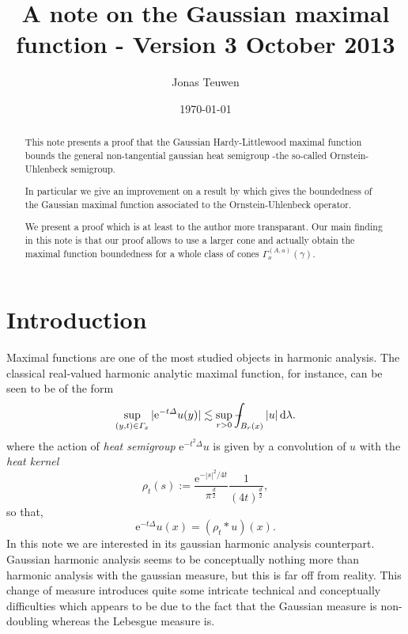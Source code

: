 \documentclass[a4paper,oneside,10pt]{amsproc}
\title[Gaussian maximal functions]{A note on the Gaussian maximal
  function - Version 3 October 2013}
\author{Jonas Teuwen}%
\date{\today}
\theoremstyle{plain}
\theoremstyle{remark}
\newcommand{\D}{\,\textup{d}}
\def\Xint#1{\mathchoice
  {\XXint\displaystyle\textstyle{#1}}%
  {\XXint\textstyle\scriptstyle{#1}}%
  {\XXint\scriptstyle\scriptscriptstyle{#1}}%
  {\XXint\scriptscriptstyle\scriptscriptstyle{#1}}%
  \!\int}
\def\XXint#1#2#3{{\setbox0=\hbox{$#1{#2#3}{\int}$ }
    \vcenter{\hbox{$#2#3$ }}\kern-.535\wd0}}
\def\dashint{\Xint-}
\newcommand{\e}{\mathrm{e}} %
\begin{document}
\begin{abstract}
  This note presents a proof that the Gaussian Hardy-Littlewood maximal
  function bounds the general non-tangential gaussian heat semigroup -the
  so-called Ornstein-Uhlenbeck semigroup.

  In particular we give an improvement on a result by
  \textcite{Pineda2008} which gives the boundedness of the Gaussian
  maximal function associated to the Ornstein-Uhlenbeck operator.

  We present a proof which is at least to the author more transparant.
  Our main finding in this note is that our proof allows to use a
  larger cone and actually obtain the maximal function boundedness for
  a whole class of cones $\Gamma^{(A, a)}_x(\gamma)$.
\end{abstract}


\maketitle
\section{Introduction}
Maximal functions are one of the most studied objects in harmonic
analysis. 
The classical real-valued harmonic analytic maximal
function, for instance, can be seen to be of the form
\begin{equation*}
  \sup_{(y, t) \in \Gamma_x} |\e^{-t \Delta} u(y)| \lesssim \sup_{r
    > 0}  \dashint_{B_r(x)} |u| \D\lambda.
\end{equation*}
where the action of \emph{heat semigroup} $\e^{-t^2 \Delta} u$ is
given by a convolution of $u$ with the \emph{heat kernel}
\begin{equation*}
  \rho_t(s) := \frac{\e^{-|s|^2/4t}}{\pi^{\frac{d}2}}
  \frac1{(4t)^{\frac{d}2}},
\end{equation*}
so that,
\begin{equation*}
  \e^{-t \Delta} u(x) = (\rho_t \ast u)(x).
\end{equation*}
In this note we are interested in its gaussian harmonic analysis
counterpart. Gaussian harmonic analysis seems to be conceptually
nothing more than harmonic analysis with the gaussian measure, but
this is far off from reality. This change of measure introduces quite
some intricate technical and conceptually difficulties which appears
to be due to the fact that the Gaussian measure is non-doubling
whereas the Lebesgue measure is.
\end{document}
